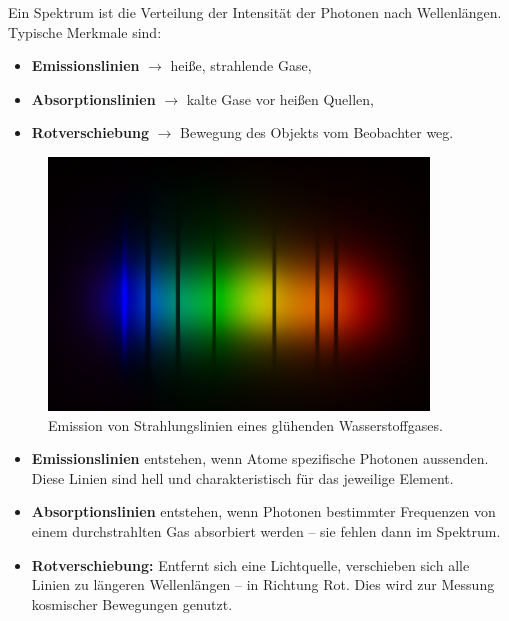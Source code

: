 \begin{tcolorbox}[didaktikbox, title=Was zeigt ein Spektrum?]
	\label{box:was zeigt spektrum}
	\small
	Ein Spektrum ist die Verteilung der Intensität der Photonen nach Wellenlängen. Typische Merkmale sind:
	\begin{itemize}
		\item \textbf{Emissionslinien} $\rightarrow$ heiße, strahlende Gase,
		\item \textbf{Absorptionslinien} $\rightarrow$  kalte Gase vor heißen Quellen,
		\item \textbf{Rotverschiebung} $\rightarrow$  Bewegung des Objekts vom Beobachter weg.
	\end{itemize}
\end{tcolorbox}
\begin{figure}[H]
	\centering
	\includegraphics[width=0.9\textwidth]{bilder/emissionslinien.png}
	\caption{Emission von Strahlungslinien eines glühenden \newline Wasserstoffgases.}
	\label{fig:emission_hydrogen}
\end{figure}

\begin{tcolorbox}[physikbox, title=Spektrallinien und Rotverschiebung]
	\label{box:spektrallinien}
	\small
	\begin{itemize}
		\item \textbf{Emissionslinien} entstehen, wenn Atome spezifische Photonen aussenden. Diese Linien sind hell und charakteristisch für das jeweilige Element.
		\item \textbf{Absorptionslinien} entstehen, wenn Photonen bestimmter Frequenzen von einem durchstrahlten Gas absorbiert werden – sie fehlen dann im Spektrum.
		\item \textbf{Rotverschiebung:} Entfernt sich eine Lichtquelle, verschieben sich alle Linien zu längeren Wellenlängen – in Richtung Rot. Dies wird zur Messung kosmischer Bewegungen genutzt.
	\end{itemize}
\end{tcolorbox}

